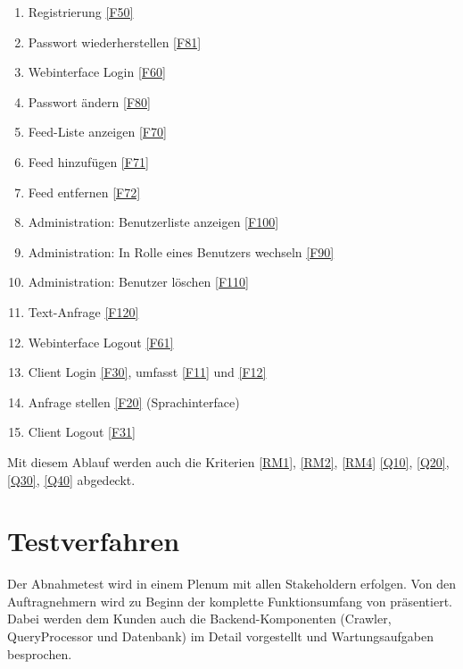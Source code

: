 \begin{enumerate}

\item Registrierung \ref{F50}

\item Passwort wiederherstellen \ref{F81}

\item Webinterface Login \ref{F60}

\item Passwort ändern \ref{F80}

\item Feed-Liste anzeigen \ref{F70}

\item Feed hinzufügen \ref{F71}

\item Feed entfernen \ref{F72}

\item Administration: Benutzerliste anzeigen \ref{F100}

\item Administration: In Rolle eines Benutzers wechseln \ref{F90}

\item Administration: Benutzer löschen \ref{F110}

\item Text-Anfrage \ref{F120}

\item Webinterface Logout \ref{F61}

\item Client Login \ref{F30}, umfasst \ref{F11} und \ref{F12}

\item Anfrage stellen \ref{F20} (Sprachinterface)

\item Client Logout \ref{F31}

\end{enumerate}

Mit diesem Ablauf werden auch die Kriterien \ref{RM1}, \ref{RM2}, \ref{RM4}
\ref{Q10}, \ref{Q20}, \ref{Q30}, \ref{Q40} abgedeckt.

\section{Testverfahren}
\label{sec:testverfahren}

Der Abnahmetest wird in einem Plenum mit allen Stakeholdern erfolgen. Von den
Auftragnehmern wird zu Beginn der komplette Funktionsumfang von \NewsGenie
präsentiert. Dabei werden dem Kunden auch die Backend-Komponenten (Crawler,
QueryProcessor und Datenbank) im Detail vorgestellt und Wartungsaufgaben
besprochen.

